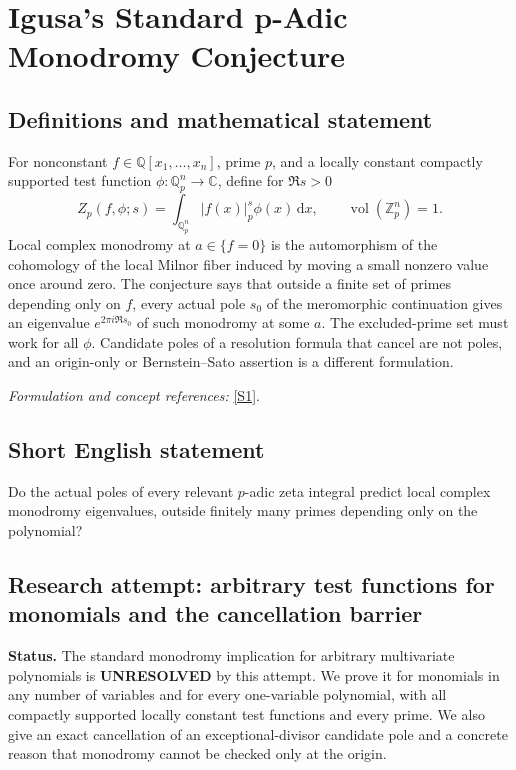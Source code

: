 \documentclass[11pt]{article}
\begin{document}
\section*{\texorpdfstring{Igusa’s Standard p-Adic Monodromy Conjecture}{Igusa’s Standard p-Adic Monodromy Conjecture}}\label{30006888}
\subsection{Definitions and mathematical statement}
For nonconstant $f\in{\mathbb{Q}}[x_1,\ldots,x_n]$, prime $p$, and a locally constant compactly supported test function $\phi:{\mathbb{Q}}_p^n\to{\mathbb{C}}$, define for $\Re s>0$
\[
 Z_p(f,\phi;s)=\int_{{\mathbb{Q}}_p^n}|f(x)|_p^s\phi(x){\,\mathrm{d}} x,
 \qquad\operatorname{vol}({\mathbb{Z}}_p^n)=1.
\]
Local complex monodromy at $a\in\{f=0\}$ is the automorphism of the cohomology of the local Milnor fiber induced by moving a small nonzero value once around zero. The conjecture says that outside a finite set of primes depending only on $f$, every actual pole $s_0$ of the meromorphic continuation gives an eigenvalue $e^{2\pi i\Re s_0}$ of such monodromy at some $a$. The excluded-prime set must work for all $\phi$. Candidate poles of a resolution formula that cancel are not poles, and an origin-only or Bernstein--Sato assertion is a different formulation.
\par\smallskip\textit{Formulation and concept references:} \href{https://arxiv.org/pdf/2403.03343}{[S1]}.

\subsection{Short English statement}
Do the actual poles of every relevant $p$-adic zeta integral predict local complex monodromy eigenvalues, outside finitely many primes depending only on the polynomial?
\subsection{Research attempt: arbitrary test functions for monomials and the cancellation barrier}
\textbf{Status.} The standard monodromy implication for arbitrary multivariate polynomials is \textbf{UNRESOLVED} by this attempt. We prove it for monomials in any number of variables and for every one-variable polynomial, with all compactly supported locally constant test functions and every prime. We also give an exact cancellation of an exceptional-divisor candidate pole and a concrete reason that monodromy cannot be checked only at the origin.
\end{document}

